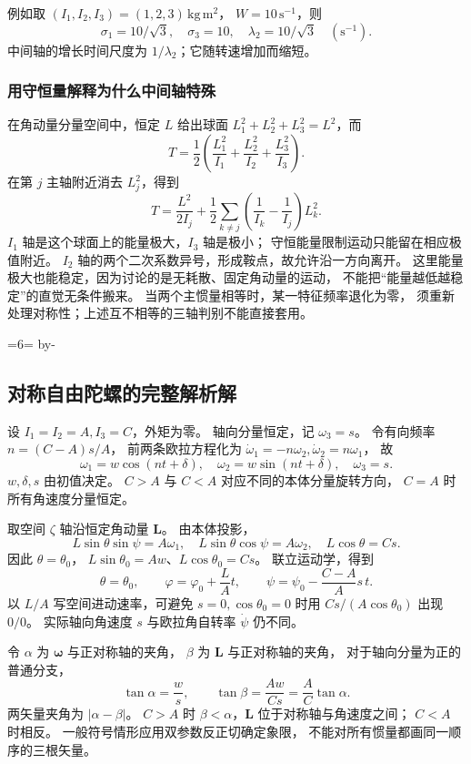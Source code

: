 \documentclass[UTF8,zihao=-4,fontset=fandol,a4paper]{ctexart}
\makeatletter
\newcommand{\vect}[1]{\bm{#1}}
\newcommand{\Needspace}[1]{\par\if@nobreak\else\penalty0\begingroup\dimen0=#1\relax\dimen2=\pagegoal\advance\dimen2 by-\pagetotal\ifdim\dimen0>\dimen2\newpage\fi\endgroup\fi}
\let\SavedSubsection\subsection
\renewcommand{\subsection}{\Needspace{6\baselineskip}\SavedSubsection}
\makeatother
\begin{document}
例如取 $(I_1,I_2,I_3)=(1,2,3)\,\mathrm{kg\,m^2}$，
$W=10\,\mathrm{s^{-1}}$，则
\[
\sigma_1=10/\sqrt3,\quad\sigma_3=10,
\quad\lambda_2=10/\sqrt3\quad (\mathrm{s^{-1}}).
\]
中间轴的增长时间尺度为 $1/\lambda_2$；它随转速增加而缩短。

\subsubsection*{用守恒量解释为什么中间轴特殊}
在角动量分量空间中，恒定 $L$ 给出球面
$L_1^2+L_2^2+L_3^2=L^2$，而
\[
T=\frac12\left(\frac{L_1^2}{I_1}
+\frac{L_2^2}{I_2}+\frac{L_3^2}{I_3}\right).
\]
在第 $j$ 主轴附近消去 $L_j^2$，得到
\[
T=\frac{L^2}{2I_j}
+\frac12\sum_{k\ne j}
\left(\frac1{I_k}-\frac1{I_j}\right)L_k^2.
\]
$I_1$ 轴是这个球面上的能量极大，$I_3$ 轴是极小；
守恒能量限制运动只能留在相应极值附近。
$I_2$ 轴的两个二次系数异号，形成鞍点，故允许沿一方向离开。
这里能量极大也能稳定，因为讨论的是无耗散、固定角动量的运动，
不能把“能量越低越稳定”的直觉无条件搬来。
当两个主惯量相等时，某一特征频率退化为零，
须重新处理对称性；上述互不相等的三轴判别不能直接套用。

\subsection{对称自由陀螺的完整解析解}\label{sub:c3-8.4}
设 $I_1=I_2=A,I_3=C$，外矩为零。
轴向分量恒定，记 $\omega_3=s$。
令有向频率 $n=(C-A)s/A$，
前两条欧拉方程化为
$\dot\omega_1=-n\omega_2,\dot\omega_2=n\omega_1$，
故
\[
\omega_1=w\cos(nt+\delta),\quad
\omega_2=w\sin(nt+\delta),\quad \omega_3=s.
\]
$w,\delta,s$ 由初值决定。
$C>A$ 与 $C<A$ 对应不同的本体分量旋转方向，
$C=A$ 时所有角速度分量恒定。

取空间 $\zeta$ 轴沿恒定角动量 $\vect L$。
由本体投影，
\[
L\sin\theta\sin\psi=A\omega_1,\quad
L\sin\theta\cos\psi=A\omega_2,\quad
L\cos\theta=Cs.
\]
因此 $\theta=\theta_0$，
$L\sin\theta_0=Aw$、$L\cos\theta_0=Cs$。
联立运动学，得到
\begin{equation}\label{eq:freegyro}
\theta=\theta_0,\qquad
\varphi=\varphi_0+\frac LA t,\qquad
\psi=\psi_0-\frac{C-A}{A}s\,t.
\end{equation}
以 $L/A$ 写空间进动速率，可避免
$s=0,\cos\theta_0=0$ 时用 $Cs/(A\cos\theta_0)$ 出现 $0/0$。
实际轴向角速度 $s$ 与欧拉角自转率 $\dot\psi$ 仍不同。

令 $\alpha$ 为 $\vect\omega$ 与正对称轴的夹角，
$\beta$ 为 $\vect L$ 与正对称轴的夹角，
对于轴向分量为正的普通分支，
\[
\tan\alpha=\frac ws,\qquad
\tan\beta=\frac{Aw}{Cs}=\frac AC\tan\alpha.
\]
两矢量夹角为 $|\alpha-\beta|$。
$C>A$ 时 $\beta<\alpha$，$\vect L$ 位于对称轴与角速度之间；
$C<A$ 时相反。
一般符号情形应用双参数反正切确定象限，
不能对所有惯量都画同一顺序的三根矢量。
\end{document}
